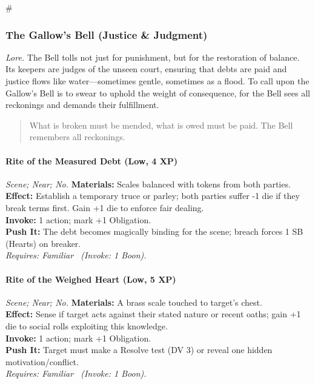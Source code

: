 # %

\subsubsection{The Gallow's Bell (Justice \& Judgment)}
\textit{Lore.} The Bell tolls not just for punishment, but for the restoration of balance. Its keepers are judges of the unseen court, ensuring that debts are paid and justice flows like water—sometimes gentle, sometimes as a flood. To call upon the Gallow's Bell is to swear to uphold the weight of consequence, for the Bell sees all reckonings and demands their fulfillment.

\begin{quote}
What is broken must be mended, what is owed must be paid. The Bell remembers all reckonings.
\end{quote}

\paragraph*{Rite of the Measured Debt (Low, 4 XP)} \emph{Scene; Near; No.}
\textbf{Materials:} Scales balanced with tokens from both parties. \\
\textbf{Effect:} Establish a temporary truce or parley; both parties suffer -1 die if they break terms first. Gain +1 die to enforce fair dealing. \\
\textbf{Invoke:} 1 action; mark +1 Obligation. \\
\textbf{Push It:} The debt becomes magically binding for the scene; breach forces 1 SB (Hearts) on breaker. \\
\emph{Requires: Familiar \ (\textit{Invoke:} 1 Boon).}

\paragraph*{Rite of the Weighed Heart (Low, 5 XP)} \emph{Scene; Near; No.}
\textbf{Materials:} A brass scale touched to target's chest. \\
\textbf{Effect:} Sense if target acts against their stated nature or recent oaths; gain +1 die to social rolls exploiting this knowledge. \\
\textbf{Invoke:} 1 action; mark +1 Obligation. \\
\textbf{Push It:} Target must make a Resolve test (DV 3) or reveal one hidden motivation/conflict. \\
\emph{Requires: Familiar \ (\textit{Invoke:} 1 Boon).}

